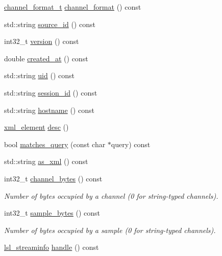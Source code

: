\begin{DoxyCompactItemize}
\item 
\hyperlink{namespacelsl_a28d50dae6fd82eea8893ce3d63ccd46c}{channel\+\_\+format\+\_\+t} \hyperlink{classlsl_1_1stream__info_aa9695e52570e617d1c7dd4ea9f88b15d}{channel\+\_\+format} () const
\item 
std\+::string \hyperlink{classlsl_1_1stream__info_a1f20c68246a88047978d9b03e14a9d2b}{source\+\_\+id} () const
\item 
int32\+\_\+t \hyperlink{classlsl_1_1stream__info_aabd83f83d0abe8671e766e97f471dea9}{version} () const
\item 
double \hyperlink{classlsl_1_1stream__info_a9a5be16db42c09b1f0cced52a2259db8}{created\+\_\+at} () const
\item 
std\+::string \hyperlink{classlsl_1_1stream__info_ae6fa890ffd440f298dd02fe71eaf3b82}{uid} () const
\item 
std\+::string \hyperlink{classlsl_1_1stream__info_a59036c0e83bcb07b711ec7e3e3b15fef}{session\+\_\+id} () const
\item 
std\+::string \hyperlink{classlsl_1_1stream__info_a52db8d9e073297477d1183dfebe8dcda}{hostname} () const
\item 
\hyperlink{classlsl_1_1xml__element}{xml\+\_\+element} \hyperlink{classlsl_1_1stream__info_a7bbc53bb041757eb87c6c73564981390}{desc} ()
\item 
bool \hyperlink{classlsl_1_1stream__info_a6c3474322d467e8d8198c7a6e4c7ad76}{matches\+\_\+query} (const char $\ast$query) const
\item 
std\+::string \hyperlink{classlsl_1_1stream__info_ab1ccb9c2a1945c7051a0e90edaba8996}{as\+\_\+xml} () const
\item 
int32\+\_\+t \hyperlink{classlsl_1_1stream__info_a7eb192e1913596b017137347e4cc5847}{channel\+\_\+bytes} () const
\begin{DoxyCompactList}\small\item\em Number of bytes occupied by a channel (0 for string-\/typed channels). \end{DoxyCompactList}\item 
int32\+\_\+t \hyperlink{classlsl_1_1stream__info_ab68def3a9c81c289ba46a5b40c6b4084}{sample\+\_\+bytes} () const
\begin{DoxyCompactList}\small\item\em Number of bytes occupied by a sample (0 for string-\/typed channels). \end{DoxyCompactList}\item 
\hyperlink{namespacelsl_aa0a9ce9956061679949daa2e35aae2e8}{lsl\+\_\+streaminfo} \hyperlink{classlsl_1_1stream__info_a532f6e8b29052cf11fbf87aeb3424304}{handle} () const

\end{DoxyCompactItemize}
